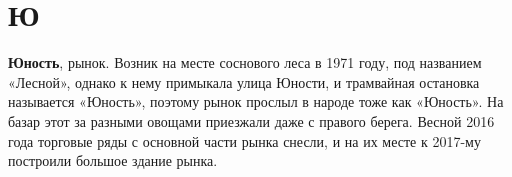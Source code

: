 \chapter*{Ю}

\textbf{Юность}, рынок. Возник на месте соснового леса в 1971 году, под названием «Лесной», однако к нему примыкала улица Юности, и трамвайная остановка называется «Юность», поэтому рынок прослыл в народе тоже как «Юность». На базар этот за разными овощами приезжали даже с правого берега. Весной 2016 года торговые ряды с основной части рынка снесли, и на их месте к 2017-му построили большое здание рынка.
